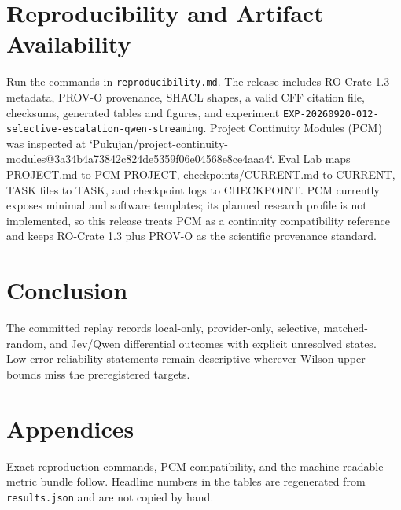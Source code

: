 \documentclass[11pt]{article}
\begin{document}
\section{Reproducibility and Artifact Availability}
Run the commands in \texttt{reproducibility.md}. The release includes RO-Crate 1.3 metadata, PROV-O provenance, SHACL shapes, a valid CFF citation file, checksums, generated tables and figures, and experiment \texttt{EXP-20260920-012-selective-escalation-qwen-streaming}. Project Continuity Modules (PCM) was inspected at `Pukujan/project-continuity-modules@3a34b4a73842c824de5359f06e04568e8ce4aaa4`. Eval Lab maps PROJECT.md to PCM PROJECT, checkpoints/CURRENT.md to CURRENT, TASK files to TASK, and checkpoint logs to CHECKPOINT. PCM currently exposes minimal and software templates; its planned research profile is not implemented, so this release treats PCM as a continuity compatibility reference and keeps RO-Crate 1.3 plus PROV-O as the scientific provenance standard.
\section{Conclusion}
The committed replay records local-only, provider-only, selective, matched-random, and Jev/Qwen differential outcomes with explicit unresolved states. Low-error reliability statements remain descriptive wherever Wilson upper bounds miss the preregistered targets.
\appendix
\section{Appendices}
Exact reproduction commands, PCM compatibility, and the machine-readable metric bundle follow. Headline numbers in the tables are regenerated from \texttt{results.json} and are not copied by hand.



\end{document}
